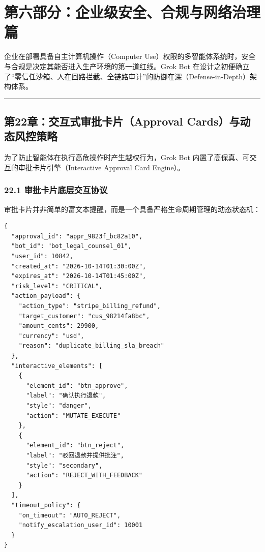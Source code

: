 \documentclass[10.5pt,a4paper,oneside]{report}
\begin{document}
\chapter{第六部分：企业级安全、合规与网络治理篇}\label{ux7b2cux516dux90e8ux5206ux4f01ux4e1aux7ea7ux5b89ux5168ux5408ux89c4ux4e0eux7f51ux7edcux6cbbux7406ux7bc7}

企业在部署具备自主计算机操作（Computer
Use）权限的多智能体系统时，安全与合规是决定其能否进入生产环境的第一道红线。Grok
Bot
在设计之初便确立了``零信任沙箱、人在回路拦截、全链路审计''的防御在深（Defense-in-Depth）架构体系。

\begin{center}\rule{0.5\linewidth}{0.5pt}\end{center}

\section{第22章：交互式审批卡片（Approval
Cards）与动态风控策略}\label{ux7b2c22ux7ae0ux4ea4ux4e92ux5f0fux5ba1ux6279ux5361ux7247approval-cardsux4e0eux52a8ux6001ux98ceux63a7ux7b56ux7565}

为了防止智能体在执行高危操作时产生越权行为，Grok Bot
内置了高保真、可交互的审批卡片引擎（Interactive Approval Card Engine）。

\subsection{22.1
审批卡片底层交互协议}\label{ux5ba1ux6279ux5361ux7247ux5e95ux5c42ux4ea4ux4e92ux534fux8bae}

审批卡片并非简单的富文本提醒，而是一个具备严格生命周期管理的动态状态机：

\begin{lstlisting}
{
  "approval_id": "appr_9823f_bc82a10",
  "bot_id": "bot_legal_counsel_01",
  "user_id": 10842,
  "created_at": "2026-10-14T01:30:00Z",
  "expires_at": "2026-10-14T01:45:00Z",
  "risk_level": "CRITICAL",
  "action_payload": {
    "action_type": "stripe_billing_refund",
    "target_customer": "cus_98214fa8bc",
    "amount_cents": 29900,
    "currency": "usd",
    "reason": "duplicate_billing_sla_breach"
  },
  "interactive_elements": [
    {
      "element_id": "btn_approve",
      "label": "确认执行退款",
      "style": "danger",
      "action": "MUTATE_EXECUTE"
    },
    {
      "element_id": "btn_reject",
      "label": "驳回退款并提供批注",
      "style": "secondary",
      "action": "REJECT_WITH_FEEDBACK"
    }
  ],
  "timeout_policy": {
    "on_timeout": "AUTO_REJECT",
    "notify_escalation_user_id": 10001
  }
}
\end{lstlisting}
\end{document}
